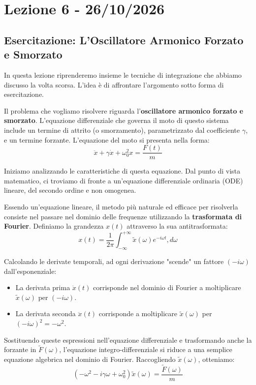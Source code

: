\chapter{Lezione 6 - 26/10/2026}

\section{Esercitazione: L'Oscillatore Armonico Forzato e Smorzato}

In questa lezione riprenderemo insieme le tecniche di integrazione che abbiamo discusso la volta scorsa. L'idea è di affrontare l'argomento sotto forma di esercitazione.

Il problema che vogliamo risolvere riguarda l'\textbf{oscillatore armonico forzato e smorzato}.
L'equazione differenziale che governa il moto di questo sistema include un termine di attrito (o smorzamento), parametrizzato dal coefficiente $\gamma$, e un termine forzante. L'equazione del moto si presenta nella forma:
\begin{equation}
\ddot{x} + \gamma \dot{x} + \omega_0^2 x = \frac{F(t)}{m}
\end{equation}

Iniziamo analizzando le caratteristiche di questa equazione. Dal punto di vista matematico, ci troviamo di fronte a un'equazione differenziale ordinaria (ODE) lineare, del secondo ordine e non omogenea.

Essendo un'equazione lineare, il metodo più naturale ed efficace per risolverla consiste nel passare nel dominio delle frequenze utilizzando la \textbf{trasformata di Fourier}.
Definiamo la grandezza $x(t)$ attraverso la sua antitrasformata:
\begin{equation}
x(t) = \frac{1}{2\pi} \int_{-\infty}^{+\infty} \tilde{x}(\omega) e^{-i\omega t} , d\omega
\end{equation}

Calcolando le derivate temporali, ad ogni derivazione "scende" un fattore $(-i\omega)$ dall'esponenziale:
\begin{itemize}
\item La derivata prima $\dot{x}(t)$ corrisponde nel dominio di Fourier a moltiplicare $\tilde{x}(\omega)$ per $(-i\omega)$.
\item La derivata seconda $\ddot{x}(t)$ corrisponde a moltiplicare $\tilde{x}(\omega)$ per $(-i\omega)^2 = -\omega^2$.
\end{itemize}

Sostituendo queste espressioni nell'equazione differenziale e trasformando anche la forzante in $\tilde{F}(\omega)$, l'equazione integro-differenziale si riduce a una semplice equazione algebrica nel dominio di Fourier. Raccogliendo $\tilde{x}(\omega)$, otteniamo:
\begin{equation}
\left(-\omega^2 - i\gamma\omega + \omega_0^2\right) \tilde{x}(\omega) = \frac{\tilde{F}(\omega)}{m}
\end{equation}

